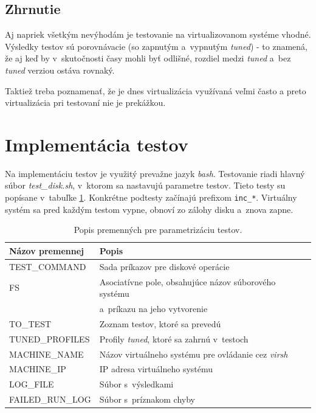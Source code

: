 \subsection{Zhrnutie}

Aj napriek všetkým nevýhodám je testovanie na virtualizovanom systéme vhodné.
Výsledky testov sú porovnávacie (so zapnutým a~vypnutým \emph{tuned}) - to
znamená, že aj keď by v~skutočnosti časy mohli byť odlišné, rozdiel medzi
\emph{tuned} a~bez \emph{tuned} verziou ostáva rovnaký.

Taktiež treba poznamenať, že je dnes virtualizácia využívaná veľmi často a
preto virtualizácia pri testovaní nie je prekážkou.

%
%

\section{Implementácia testov}

Na implementáciu testov je využitý prevažne jazyk \emph{bash}. Testovanie riadi
hlavný súbor \emph{test\_disk.sh}, v~ktorom sa nastavujú parametre testov.
Tieto testy su popísane v~tabuľke \ref{tab:test-params}. Konkrétne podtesty
začínajú prefixom \texttt{inc\_*}. Virtuálny systém sa pred každým testom
vypne, obnoví zo zálohy disku a~znova zapne.

\begin{table}[H]
\begin{center}
\begin{tabular}{|l|l|}
    \hline
    \textbf{Názov premennej} & \textbf{Popis} \\
    \hline
    TEST\_COMMAND       & Sada príkazov pre diskové operácie \\
    FS                  & Asociatívne pole, obsahujúce názov súborového systému \\ & a~príkazu na jeho vytvorenie \\
    TO\_TEST            & Zoznam testov, ktoré sa prevedú \\
    TUNED\_PROFILES     & Profily \emph{tuned}, ktoré sa zahrnú v~testoch \\
    MACHINE\_NAME       & Názov virtuálneho systému pre ovládanie cez \emph{virsh} \\
    MACHINE\_IP         & IP adresa virtuálneho systému \\
    LOG\_FILE           & Súbor s~výsledkami \\
    FAILED\_RUN\_LOG    & Súbor s~príznakom chyby \\
    \hline
\end{tabular}
\caption{Popis premenných pre parametrizáciu testov.}
\label{tab:test-params}
\end{center}
\end{table}

